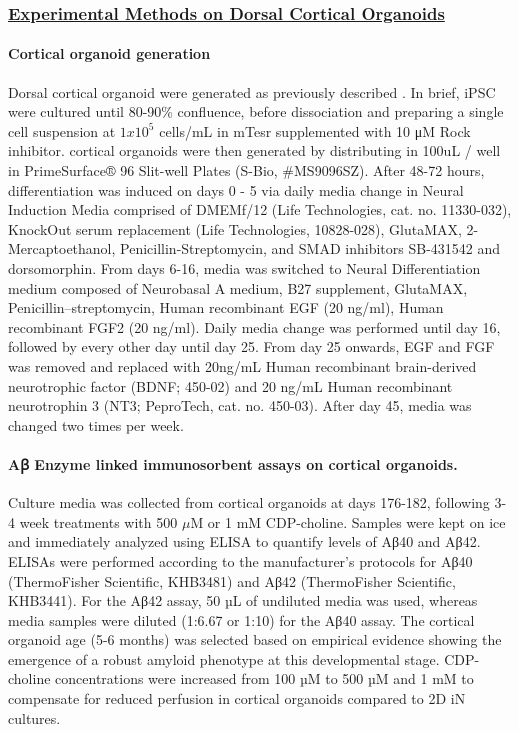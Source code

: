 \subsubsection{\underline{Experimental Methods on Dorsal Cortical Organoids}} 

\paragraph{Cortical organoid generation}
Dorsal cortical organoid were generated as previously described \supercite{Sloan2018-ja}. In brief, iPSC were cultured until 80-90\% confluence, before dissociation and preparing a single cell suspension at $1 x 10^5$ cells/mL in mTesr supplemented with 10 μM Rock inhibitor. cortical organoids were then generated by distributing in 100uL / well in PrimeSurface® 96 Slit-well Plates (S-Bio, #MS9096SZ). After 48-72 hours, differentiation was induced on days 0 - 5 via daily media change in Neural Induction Media comprised of DMEMf/12 (Life Technologies, cat. no. 11330-032), KnockOut serum replacement (Life Technologies, 10828-028), GlutaMAX, 2-Mercaptoethanol, Penicillin-Streptomycin, and SMAD inhibitors SB-431542 and dorsomorphin. From days 6-16, media was switched to Neural Differentiation medium composed of Neurobasal A medium, B27 supplement, GlutaMAX, Penicillin–streptomycin, Human recombinant EGF (20 ng/ml), Human recombinant FGF2 (20 ng/ml). Daily media change was performed until day 16, followed by every other day until day 25. From day 25 onwards, EGF and FGF was removed and replaced with 20ng/mL Human recombinant brain-derived neurotrophic factor (BDNF; 450-02) and 20 ng/mL Human recombinant neurotrophin 3 (NT3; PeproTech, cat. no. 450-03). After day 45, media was changed two times per week. 

\paragraph{Aꞵ Enzyme linked immunosorbent assays on cortical organoids.}
Culture media was collected from cortical organoids at days 176-182, following 3-4 week treatments with 500 $\mu$M or 1 mM CDP-choline. Samples were kept on ice and immediately analyzed using ELISA to quantify levels of Aβ40 and Aβ42. ELISAs were performed according to the manufacturer’s protocols for Aβ40 (ThermoFisher Scientific, KHB3481) and Aβ42 (ThermoFisher Scientific, KHB3441). For the Aβ42 assay, 50 µL of undiluted media was used, whereas media samples were diluted (1:6.67 or 1:10) for the Aβ40 assay. The cortical organoid age (5-6 months) was selected based on empirical evidence showing the emergence of a robust amyloid phenotype at this developmental stage. CDP-choline concentrations were increased from 100 µM to 500 µM and 1 mM to compensate for reduced perfusion in cortical organoids compared to 2D iN cultures.

